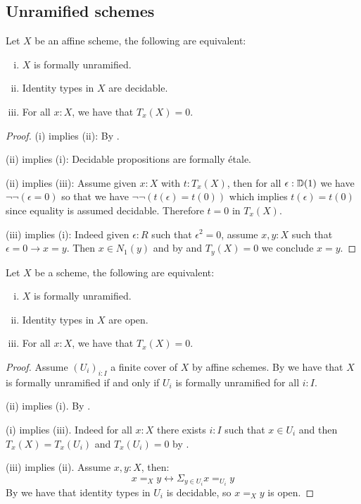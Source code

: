 

\subsection{Unramified schemes}

\begin{lemma}\label{unramified-affine-characterisation}
Let $X$ be an affine scheme, the following are equivalent:
\begin{enumerate}[(i)]
\item $X$ is formally unramified.
\item Identity types in $X$ are decidable.
\item For all $x:X$, we have that $T_x(X)=0$.
\end{enumerate}
\end{lemma}

\begin{proof}
(i) implies (ii): By .

(ii) implies (i): Decidable propositions are formally étale.

(ii) implies (iii): Assume given $x:X$ with $t:T_x(X)$, then for all $\epsilon:\mathbb{D}(1)$ we have $\neg\neg(\epsilon = 0)$ so that we have $\neg\neg (t(\epsilon) = t(0))$ which implies $t(\epsilon) = t(0)$ since equality is assumed decidable. Therefore $t = 0$ in $T_x(X)$.

(iii) implies (i): Indeed given $\epsilon:R$ such that $\epsilon^2=0$, assume $x,y:X$ such that $\epsilon=0 \to x=y$. Then $x\in N_1(y)$ and by  and $T_y(X)=0$ we conclude $x=y$.
\end{proof}

\begin{corollary}\label{unramified-scheme-characterisation}
Let $X$ be a scheme, the following are equivalent:
\begin{enumerate}[(i)]
\item $X$ is formally unramified.
\item Identity types in $X$ are open.
\item For all $x:X$, we have that $T_x(X)=0$.
\end{enumerate}
\end{corollary}

\begin{proof}
Assume $(U_i)_{i:I}$ a finite cover of $X$ by affine schemes. By  we have that $X$ is formally unramified if and only if $U_i$ is formally unramified for all $i:I$.

(ii) implies (i). By .

(i) implies (iii). Indeed for all $x:X$ there exists $i:I$ such that $x\in U_i$ and then $T_x(X) = T_x(U_i)$ and $T_x(U_i) = 0$ by .

(iii) implies (ii). Assume $x,y:X$, then:
\[x=_Xy \leftrightarrow \Sigma_{y\in U_i} x=_{U_i} y\]
By  we have that identity types in $U_i$ is decidable, so $x=_Xy$ is open.
\end{proof}

